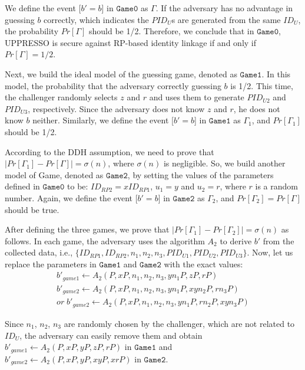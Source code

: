 We define the event [$b'=b$] in $\mathtt{Game 0}$ as $\Gamma$. If the adversary has no advantage in guessing $b$ correctly, which indicates the $PID_U$s are generated from the same $ID_U$, the probability $Pr[\Gamma]$ should be 1/2. Therefore, we conclude that in $\mathtt{Game 0}$, UPPRESSO is secure against RP-based identity linkage if and only if $Pr[\Gamma]=1/2$.


Next, we build the ideal model of the guessing game, denoted as $\mathtt{Game 1}$. In this model, the probability that the adversary correctly guessing $b$ is 1/2. This time, the challenger randomly selects $z$ and $r$ and uses them to generate $PID_{U2}$ and $PID_{U3}$, respectively. Since the adversary does not know $z$ and $r$, he does not know $b$ neither. Similarly, we define the event [$b'=b$] in $\mathtt{Game 1}$ as $\Gamma_1$, and $Pr[\Gamma_1]$ should be 1/2.

According to the DDH assumption, we need to prove that $|Pr[\Gamma_1]-Pr[\Gamma]|=\sigma(n)$, where $\sigma(n)$ is negligible. So, we build another model of Game, denoted as $\mathtt{Game 2}$, by setting the values of the parameters defined in $\mathtt{Game 0}$ to be: $ID_{RP2}=xID_{RP1}$, $u_1=y$ and $u_2=r$, where $r$ is a random number. Again, we define the event [$b'=b$] in  $\mathtt{Game 2}$ as $\Gamma_2$, and $Pr[\Gamma_2]=Pr[\Gamma]$ should be true.

After defining the three games, we prove that $|Pr[\Gamma_1]-Pr[\Gamma_2]|=\sigma(n)$ as follows. In each game, the adversary uses the algorithm $A_2$ to derive $b'$ from the collected data, i.e., $\{ID_{RP1},ID_{RP2},n_1,n_2,n_3,PID_{U1},PID_{U2},PID_{U3}\}$. Now, let us replace the parameters in $\mathtt{Game 1}$ and $\mathtt{Game 2}$ with the exact values:
\vspace{-\topsep}
\begin{equation*}
\begin{aligned}
    b'_{game1} \gets A_2(P,xP,n_1,n_2,n_3,yn_1P,zP,rP) \\
    b'_{game2}\gets A_2(P,xP,n_1,n_2,n_3,yn_1P,xyn_2P,rn_3P) \\
    or \; b'_{game2}\gets A_2(P,xP,n_1,n_2,n_3,yn_1P,rn_2P,xyn_3P)
\end{aligned}
\end{equation*}
\vspace{-\topsep}

Since $n_1$, $n_2$, $n_3$ are randomly chosen by the challenger, which are not related to $ID_U$, the adversary can easily remove them and obtain $b'_{game1}\gets A_2(P,xP,yP,zP,rP)$ in $\mathtt{Game 1}$ and $b'_{game2}\gets A_2(P,xP,yP,xyP,xrP)$ in $\mathtt{Game 2}$.

